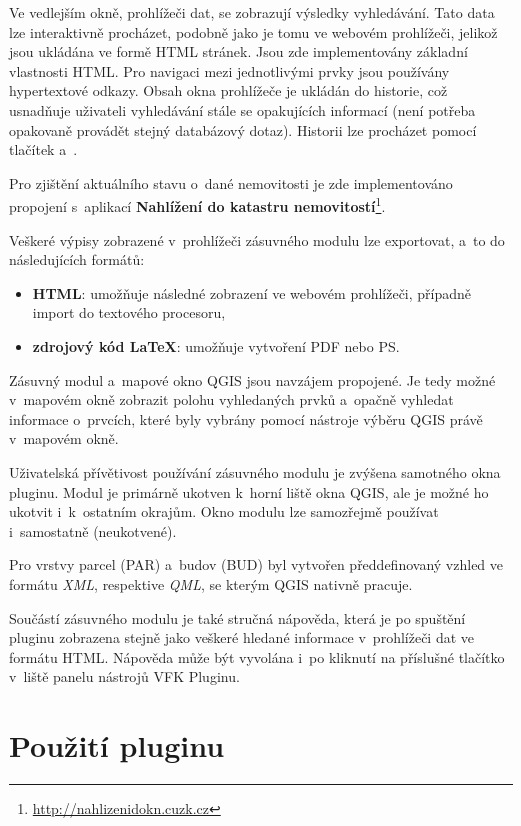 \documentclass[a4paper,12pt,oneside]{book}
\newcommand{\latex}{\LaTeX}
\begin{document}
Ve vedlejším okně, prohlížeči dat, se zobrazují výsledky
vyhledávání. Tato data lze interaktivně procházet, podobně jako je
tomu ve webovém prohlížeči, jelikož jsou ukládána ve formě HTML
stránek. Jsou zde implementovány základní vlastnosti HTML. Pro
navigaci mezi jednotlivými prvky jsou používány hypertextové
odkazy. Obsah okna prohlížeče je ukládán do historie, což usnadňuje
uživateli vyhledávání stále se opakujících informací (není potřeba
opakovaně provádět stejný databázový dotaz). Historii lze procházet
pomocí tlačítek  a~.

Pro zjištění aktuálního stavu o~dané nemovitosti je zde implementováno
propojení s~aplikací \textbf{Nahlížení do katastru
  nemovitostí}\footnote{\url{http://nahlizenidokn.cuzk.cz}}.

Veškeré výpisy zobrazené v~prohlížeči zásuvného modulu lze exportovat,
a~to do následujících formátů:

\begin{itemize}
 \item \textbf{HTML}: umožňuje následné zobrazení ve webovém prohlížeči, případně import do textového procesoru,
 \item \textbf{zdrojový kód \latex}: umožňuje vytvoření PDF nebo PS.
\end{itemize}

Zásuvný modul a~mapové okno QGIS jsou navzájem propojené. Je tedy
možné v~mapovém okně zobrazit polohu vyhledaných prvků a~opačně
vyhledat informace o~prvcích, které byly vybrány pomocí nástroje
výběru QGIS právě v~mapovém okně.

Uživatelská přívětivost používání zásuvného modulu je zvýšena
 samotného okna pluginu. Modul je primárně ukotven
k~horní liště okna QGIS, ale je možné ho ukotvit i~k~ostatním
okrajům. Okno modulu lze samozřejmě používat i~samostatně
(neukotvené).

Pro vrstvy parcel (PAR) a~budov (BUD) byl vytvořen
předdefinovaný vzhled ve formátu \textit{XML}, respektive
\textit{QML}, se kterým QGIS nativně pracuje.

Součástí zásuvného modulu je také stručná nápověda, která je po
spuštění pluginu zobrazena stejně jako veškeré hledané informace
v~prohlížeči dat ve formátu HTML. Nápověda může být vyvolána i~po
kliknutí na příslušné tlačítko v~liště panelu nástrojů VFK
Pluginu. \cite{cvut_vfkPlugin}

\newpage
\section{Použití pluginu}
\end{document}
